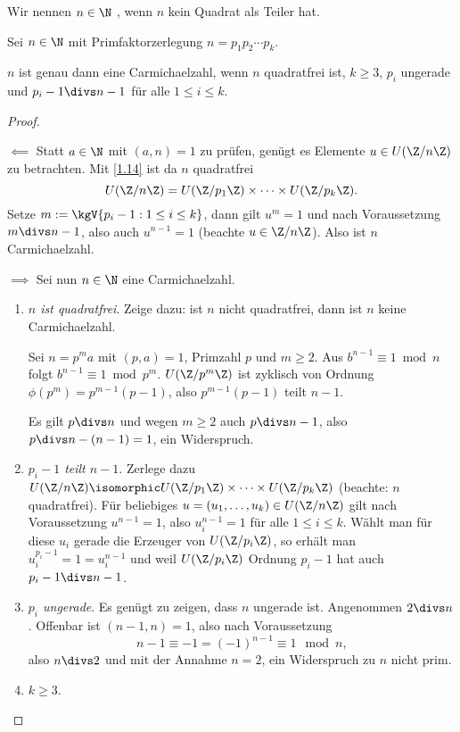 \begin{df*}
	Wir nennen $n \in \N$ , wenn $n$ kein Quadrat als Teiler hat.
\end{df*}

\begin{st}[Korselt, 1899] \label{3.8}
	Sei $n \in \N$ mit Primfaktorzerlegung $n = p_1 p_2 \dotsb p_k$.

	$n$ ist genau dann eine Carmichaelzahl, wenn $n$ quadratfrei ist, $k \ge 3$, $p_i$ ungerade und $p_i-1 \divs n-1$ für alle $1 \le i \le k$.
	\begin{proof}
		\begin{segnb}{$\impliedby$}
			Statt $a \in \N$ mit $(a, n) = 1$ zu prüfen, genügt es Elemente $u \in U(\Z / n\Z)$ zu betrachten.
			Mit \ref{1.14} ist da $n$ quadratfrei
			\[
				U(\Z / n\Z) = U(\Z / p_1\Z) \times \dotsb \times U(\Z / p_k \Z).
			\]
			Setze $m := \kgV \{ p_i - 1 : 1 \le i \le k \}$, dann gilt $u^m = 1$ und nach Voraussetzung $m \divs n - 1$, also auch $u^{n-1} = 1$ (beachte $u \in \Z / n\Z$).
			Also ist $n$ Carmichaelzahl.
		\end{segnb}
		\begin{segnb}{$\implies$}
			Sei nun $n \in \N$ eine Carmichaelzahl.
			\begin{enumerate}[1.]
				\item
					\emph{$n$ ist  quadratfrei}.
					Zeige dazu: ist $n$ nicht quadratfrei, dann ist $n$ keine Carmichaelzahl.

					Sei $n = p^m a$ mit $(p,a) = 1$, Primzahl $p$ und $m \ge 2$.
					Aus $b^{n-1} \equiv 1 \bmod n$ folgt $b^{n-1} \equiv 1 \bmod p^m$.
					$U(\Z / p^m \Z)$ ist zyklisch von Ordnung $\phi(p^m) = p^{m-1} (p-1)$, also $p^{m-1} (p-1)$ teilt $n-1$.

					Es gilt $p \divs n$ und wegen $m \ge 2$ auch $p \divs n-1$, also $p \divs n - (n-1) = 1$, ein Widerspruch.
				\item
					\emph{$p_i - 1$ teilt $n - 1$}.
					Zerlege dazu $U(\Z / n\Z) \isomorphic U(\Z / p_1 \Z) \times \dotsb \times U(\Z / p_k \Z)$ (beachte: $n$ quadratfrei).
					Für beliebiges $u = (u_1, \dotsc, u_k) \in U(\Z / n\Z)$ gilt nach Voraussetzung $u^{n-1} = 1$, also $u_i^{n-1} = 1$ für alle $1 \le i \le k$.
					Wählt man für diese $u_i$ gerade die Erzeuger von $U(\Z / p_i\Z)$, so erhält man $u_i^{p_i-1} = 1 = u_i^{n-1}$ und weil $U(\Z / p_i \Z)$ Ordnung $p_i - 1$ hat auch $p_i - 1 \divs n - 1$.
				\item
					\emph{$p_i$ ungerade}.
					Es genügt zu zeigen, dass $n$ ungerade ist.
					Angenommen $2 \divs n$.
					Offenbar ist $(n - 1, n) = 1$, also nach Voraussetzung
					\[
						n - 1 \equiv -1 = (-1)^{n-1} \equiv 1 \mod n,
					\]
					also $n \divs 2$ und mit der Annahme $n = 2$, ein Widerspruch zu $n$ nicht prim.
				\item
					\emph{$k \ge 3$}.
			\end{enumerate}
		\end{segnb}
	\end{proof}
\end{st}

